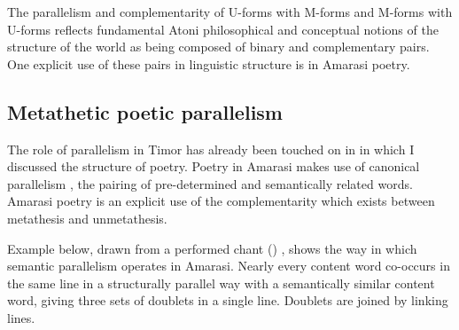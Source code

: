 \begin{exe}
	\vspace{4pt}\label{ex:120923-2, 1.39 ch:ConCon}
	\label{ex:130909-6, 0.36 ch:ConCon}
\end{exe}

The parallelism and complementarity of U-forms with M-forms
and M-forms with U-forms reflects fundamental Atoni philosophical
and conceptual notions of the structure of the world
as being composed of binary and complementary pairs.
One explicit use of these pairs in linguistic structure is in Amarasi poetry.

\subsection{Metathetic poetic parallelism}\label{sec:MetPoePar}
The role of parallelism in Timor has already been touched on
in  in which I discussed the structure of poetry.
Poetry in Amarasi makes use of canonical parallelism \citep{fo88,fo14},
the pairing of pre-determined and semantically related words.
Amarasi poetry is an explicit use of the complementarity
which exists between metathesis and unmetathesis.

Example  below,
drawn from a performed chant () ,
shows the way in which semantic parallelism operates in Amarasi.
Nearly every content word co-occurs in the same line in a structurally
parallel way with a semantically similar content word,
giving three sets of doublets in a single line.
Doublets are joined by linking lines.

